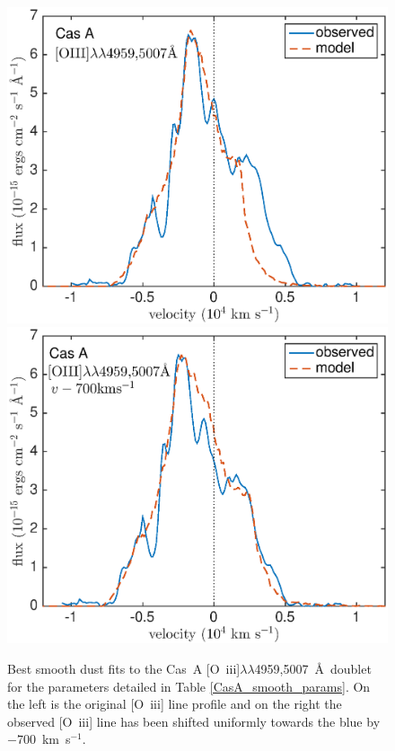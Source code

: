 {\begin{figure}
\centering
\includegraphics[scale=0.43,clip=true, trim=30 0 50 20]{chapters/chapter6/figs/CasA/CasA_OIII}
\includegraphics[scale=0.43,clip=true, trim=30 0 50 20]{chapters/chapter6/figs/CasA/CasA_shifted_OIII}
\caption{Best smooth dust fits to the Cas~A [O~{\sc iii}]$\lambda\lambda$4959,5007~\AA\ doublet for the parameters detailed in Table \ref{CasA_smooth_params}.  On the left is the original [O~{\sc iii}] line profile and on the right the observed [O~{\sc iii}] line has been shifted uniformly towards the blue by $-700$~km~s$^{-1}$.}
\label{CasA_OIII}
\end{figure}
}

